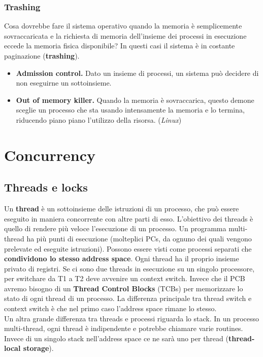 \documentclass[12pt, letterpaper]{article}
\begin{document}
			\subsubsection{Trashing}
				Cosa dovrebbe fare il sistema operativo quando la memoria è semplicemente sovraccaricata e la richiesta di memoria dell'insieme dei processi in esecuzione eccede la memoria fisica disponibile? In questi casi il sistema è in costante paginazione (\textbf{trashing}). 
				\begin{itemize}
					\item \textbf{Admission control.} Dato un insieme di processi, un sistema può decidere di non eseguirne un sottoinsieme.
					\item \textbf{Out of memory killer.} Quando la memoria è sovraccarica, questo demone sceglie un processo che sta usando intensamente la memoria e lo termina, riducendo piano piano l'utilizzo della risorsa. (\textit{Linux})
				\end{itemize}
	\newpage	
	\section{Concurrency}
		\subsection{Threads e locks}
			Un \textbf{thread }è un sottoinsieme delle istruzioni di un processo, che può essere eseguito in maniera concorrente con altre parti di esso. L’obiettivo dei threads è quello di rendere più veloce l’esecuzione di un processo. Un programma multi-thread ha più punti di esecuzione (molteplici PCs, da ognuno dei quali vengono prelevate ed eseguite istruzioni). Possono essere visti come processi separati che \textbf{condividono lo stesso address space}. Ogni thread ha il proprio insieme privato di registri. Se ci sono due threads in esecuzione su un singolo processore, per switchare da T1 a T2 deve avvenire un context switch. Invece che il PCB avremo bisogno di un \textbf{Thread Control Blocks} (TCBs) per memorizzare lo stato di ogni thread di un processo. La differenza principale tra thread switch e context switch è che nel primo caso l'address space rimane lo stesso.\\
			Un altra grande differenza tra threads e processi riguarda lo stack. In un processo multi-thread, ogni thread è indipendente e potrebbe chiamare varie routines. Invece di un singolo stack nell'address space ce ne sarà uno per thread (\textbf{thread-local storage}).\\
			
\end{document}
